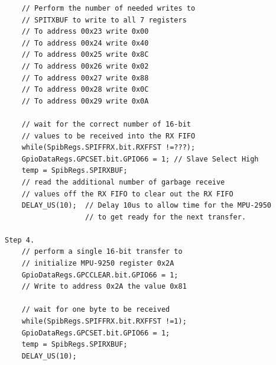 \documentclass[11pt]{article}
\begin{document}
\begin{verbatim}
    // Perform the number of needed writes to
    // SPITXBUF to write to all 7 registers
    // To address 00x23 write 0x00
    // To address 00x24 write 0x40
    // To address 00x25 write 0x8C
    // To address 00x26 write 0x02
    // To address 00x27 write 0x88
    // To address 00x28 write 0x0C
    // To address 00x29 write 0x0A

    // wait for the correct number of 16-bit
    // values to be received into the RX FIFO
    while(SpibRegs.SPIFFRX.bit.RXFFST !=???);
    GpioDataRegs.GPCSET.bit.GPIO66 = 1; // Slave Select High
    temp = SpibRegs.SPIRXBUF;
    // read the additional number of garbage receive
    // values off the RX FIFO to clear out the RX FIFO
    DELAY_US(10);  // Delay 10us to allow time for the MPU-2950
                   // to get ready for the next transfer.

Step 4.
    // perform a single 16-bit transfer to
    // initialize MPU-9250 register 0x2A
    GpioDataRegs.GPCCLEAR.bit.GPIO66 = 1;
    // Write to address 0x2A the value 0x81

    // wait for one byte to be received
    while(SpibRegs.SPIFFRX.bit.RXFFST !=1);
    GpioDataRegs.GPCSET.bit.GPIO66 = 1;
    temp = SpibRegs.SPIRXBUF;
    DELAY_US(10);


\end{verbatim}
\end{document}
